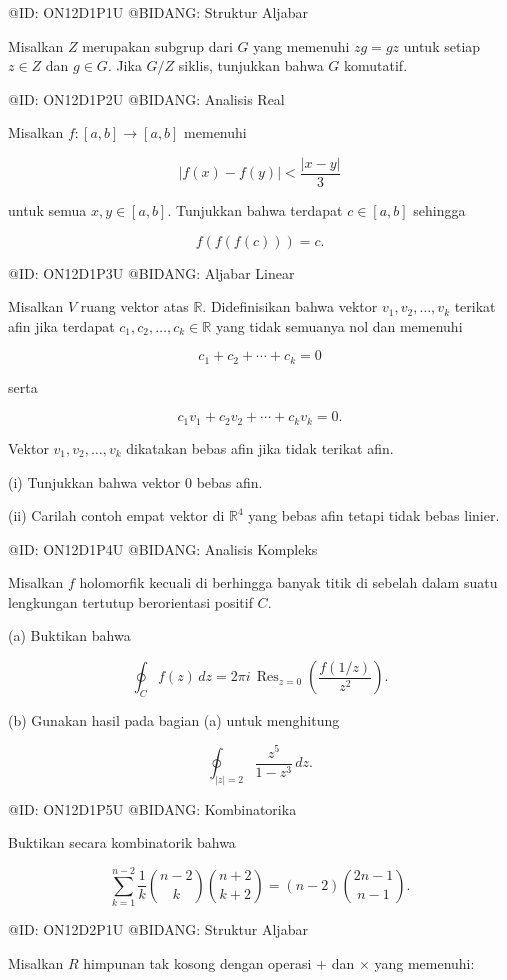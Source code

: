 @ID: ON12D1P1U
@BIDANG: Struktur Aljabar

Misalkan $Z$ merupakan subgrup dari $G$ yang memenuhi $zg=gz$ untuk setiap $z\in Z$ dan $g\in G$. Jika $G/Z$ siklis, tunjukkan bahwa $G$ komutatif.

@ID: ON12D1P2U
@BIDANG: Analisis Real

Misalkan $f:[a,b]\to[a,b]$ memenuhi

$$
|f(x)-f(y)|<\frac{|x-y|}{3}
$$

untuk semua $x,y\in[a,b]$. Tunjukkan bahwa terdapat $c\in[a,b]$ sehingga

$$
f(f(f(c)))=c.
$$

@ID: ON12D1P3U
@BIDANG: Aljabar Linear

Misalkan $V$ ruang vektor atas $\mathbb R$. Didefinisikan bahwa vektor $v_1,v_2,\ldots,v_k$ terikat afin jika terdapat $c_1,c_2,\ldots,c_k\in\mathbb R$ yang tidak semuanya nol dan memenuhi

$$
c_1+c_2+\cdots+c_k=0
$$

serta

$$
c_1v_1+c_2v_2+\cdots+c_kv_k=0.
$$

Vektor $v_1,v_2,\ldots,v_k$ dikatakan bebas afin jika tidak terikat afin.

(i) Tunjukkan bahwa vektor $0$ bebas afin.

(ii) Carilah contoh empat vektor di $\mathbb R^4$ yang bebas afin tetapi tidak bebas linier.

@ID: ON12D1P4U
@BIDANG: Analisis Kompleks

Misalkan $f$ holomorfik kecuali di berhingga banyak titik di sebelah dalam suatu lengkungan tertutup berorientasi positif $C$.

(a) Buktikan bahwa

$$
\oint_C f(z)\,dz
=
2\pi i\,
\operatorname{Res}_{z=0}
\left(
\frac{f(1/z)}{z^2}
\right).
$$

(b) Gunakan hasil pada bagian (a) untuk menghitung

$$
\oint_{|z|=2}\frac{z^5}{1-z^3}\,dz.
$$

@ID: ON12D1P5U
@BIDANG: Kombinatorika

Buktikan secara kombinatorik bahwa

$$
\sum_{k=1}^{n-2}
\frac1k
\binom{n-2}{k}
\binom{n+2}{k+2}
=
(n-2)\binom{2n-1}{n-1}.
$$

@ID: ON12D2P1U
@BIDANG: Struktur Aljabar

Misalkan $R$ himpunan tak kosong dengan operasi $+$ dan $\times$ yang memenuhi:

